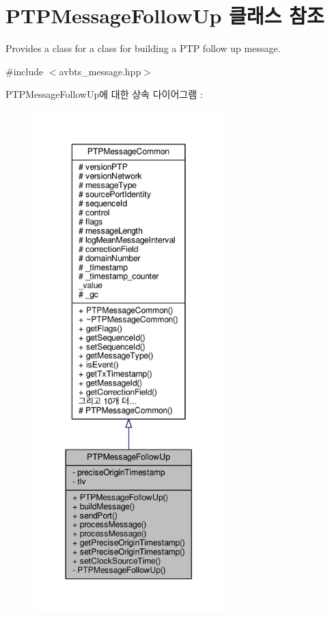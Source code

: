 \hypertarget{class_p_t_p_message_follow_up}{}\section{P\+T\+P\+Message\+Follow\+Up 클래스 참조}
\label{class_p_t_p_message_follow_up}


Provides a class for a class for building a P\+TP follow up message.  




{\ttfamily \#include $<$avbts\+\_\+message.\+hpp$>$}



P\+T\+P\+Message\+Follow\+Up에 대한 상속 다이어그램 \+: 
\nopagebreak
\begin{figure}[H]
\begin{center}
\leavevmode
\includegraphics[height=550pt]{class_p_t_p_message_follow_up__inherit__graph}
\end{center}
\end{figure}


